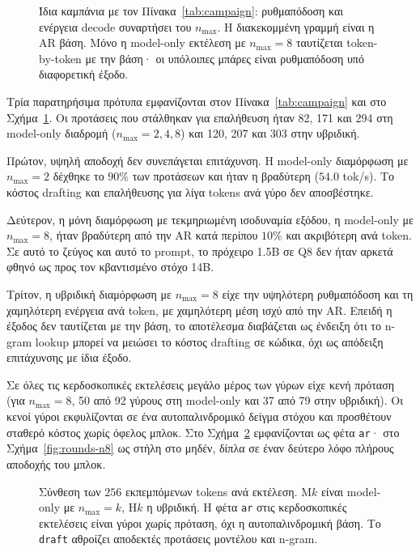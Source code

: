 \documentclass[a4paper,12pt]{report}
\theoremstyle{plain}
\theoremstyle{definition}
\theoremstyle{remark}
\begin{document}
\begin{figure}[htbp]
  \centering
  \resizebox{\linewidth}{!}{}
  \caption{Ίδια καμπάνια με τον Πίνακα~\ref{tab:campaign}: ρυθμαπόδοση και
    ενέργεια decode συναρτήσει του \(n_{\max}\). Η διακεκομμένη γραμμή είναι η
    AR βάση. Μόνο η \mbox{model-only} εκτέλεση με \(n_{\max}=8\) ταυτίζεται
    token-by-token με την βάση· οι υπόλοιπες μπάρες είναι ρυθμαπόδοση υπό
  διαφορετική έξοδο.}
  \label{fig:campaign}
\end{figure}

Τρία παρατηρήσιμα πρότυπα εμφανίζονται στον Πίνακα~\ref{tab:campaign} και στο
Σχήμα~\ref{fig:campaign}.
Οι προτάσεις που στάλθηκαν για επαλήθευση ήταν 82, 171 και 294 στη
model-only διαδρομή (\(n_{\max}=2,4,8\)) και 120, 207 και 303 στην υβριδική.

Πρώτον, υψηλή αποδοχή δεν συνεπάγεται επιτάχυνση. Η model-only διαμόρφωση με
\(n_{\max}=2\) δέχθηκε το \(90\%\) των προτάσεων και ήταν η βραδύτερη
(\(54.0\) tok/s). Το κόστος drafting και επαλήθευσης για λίγα tokens ανά γύρο
δεν αποσβέστηκε.

Δεύτερον, η μόνη διαμόρφωση με τεκμηριωμένη ισοδυναμία εξόδου, η model-only
με \(n_{\max}=8\), ήταν βραδύτερη από την AR κατά περίπου \(10\%\) και
ακριβότερη ανά token. Σε αυτό το ζεύγος και αυτό το prompt, το πρόχειρο 1.5B
σε Q8 δεν ήταν αρκετά φθηνό ως προς τον κβαντισμένο στόχο 14B.

Τρίτον, η υβριδική διαμόρφωση με \(n_{\max}=8\) είχε την υψηλότερη
ρυθμαπόδοση και τη χαμηλότερη ενέργεια ανά token, με χαμηλότερη μέση ισχύ από
την AR. Επειδή η έξοδος δεν ταυτίζεται με την βάση, το αποτέλεσμα διαβάζεται
ως ένδειξη ότι το n-gram lookup μπορεί να μειώσει το κόστος drafting σε
κώδικα, όχι ως απόδειξη επιτάχυνσης με ίδια έξοδο.

Σε όλες τις κερδοσκοπικές εκτελέσεις μεγάλο μέρος των γύρων είχε κενή
πρόταση (για \(n_{\max}=8\), 50 από 92 γύρους στη model-only και 37 από 79
στην υβριδική). Οι κενοί γύροι εκφυλίζονται σε ένα αυτοπαλινδρομικό δείγμα
στόχου και προσθέτουν σταθερό κόστος χωρίς όφελος μπλοκ. Στο
Σχήμα~\ref{fig:token-mix} εμφανίζονται ως φέτα \texttt{ar}· στο
Σχήμα~\ref{fig:rounds-n8} ως στήλη στο μηδέν, δίπλα σε έναν δεύτερο λόφο
πλήρους αποδοχής του μπλοκ.

\begin{figure}[htbp]
  \centering
  \resizebox{\linewidth}{!}{}
  \caption{Σύνθεση των \(256\) εκπεμπόμενων tokens ανά εκτέλεση. M\(k\) είναι
    \mbox{model-only} με \(n_{\max}=k\), H\(k\) η υβριδική. Η φέτα
    \texttt{ar} στις
    κερδοσκοπικές εκτελέσεις είναι γύροι χωρίς πρόταση, όχι η αυτοπαλινδρομική
  βάση. Το \texttt{draft} αθροίζει αποδεκτές προτάσεις μοντέλου και n-gram.}
  \label{fig:token-mix}
\end{figure}
\end{document}
